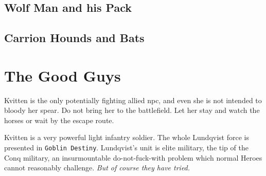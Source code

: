 \subsection*{Wolf Man and his Pack}
\label{sec:wolfmanstats}







\subsection*{Carrion Hounds and Bats}
\label{sec:carrionstats}





















\clearpage
{}
\section*{The Good Guys}

Kvitten is the only potentially fighting allied npc, and even she is not intended to bloody her spear. Do not bring her to the battlefield. Let her stay and watch the horses or wait by the escape route.

Kvitten is a very powerful light infantry soldier. The whole Lundqvist force is presented in \texttt{Goblin Destiny}. Lundqvist's unit is elite military, the tip of the Conq military, an insurmountable do-not-fuck-with problem which normal Heroes cannot reasonably challenge. \textit{But of course they have tried.}


